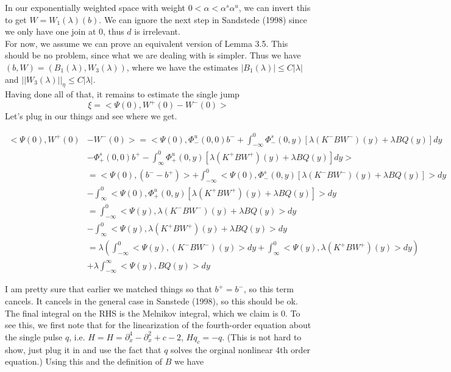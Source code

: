 \documentclass[12pt]{article}
\begin{document}
In our exponentially weighted space with weight $0 < \alpha < \alpha^s \alpha^u$, we can invert this to get $W = W_1(\lambda)(b)$. We can ignore the next step in Sandstede (1998) since we only have one join at 0, thus $d$ is irrelevant. \\

For now, we assume we can prove an equivalent version of Lemma 3.5. This should be no problem, since what we are dealing with is simpler. Thus we have $(b, W) = (B_1(\lambda), W_3(\lambda))$, where we have the estimates $|B_1(\lambda)| \leq C|\lambda|$ and $||W_3(\lambda)||_\eta \leq C|\lambda|$.\\

Having done all of that, it remains to estimate the single jump
\[
\xi = <\Psi(0), W^+(0) - W^-(0)>
\]
Let's plug in our things and see where we get.

\begin{align*}
<\Psi(0), W^+(0) &- W^-(0)> = < \Psi(0), \Phi^u_-(0, 0)b^- + \int_{-\infty}^0 \Phi^s_-(0, y)[\lambda (K^- B W^-)(y) + \lambda B Q(y) ] dy  \\
&- \Phi^s_+(0, 0)b^+ - \int_\infty^0 \Phi^u_+(0, y)[\lambda (K^+ B W^+)(y) + \lambda B Q(y) ] dy >\\
&= < \Psi(0), (b^- - b^+)> + \int_{-\infty}^0 < \Psi(0), \Phi^s_-(0, y)[\lambda (K^- B W^-)(y) + \lambda B Q(y) ] > dy  \\
&- \int_\infty^0 < \Psi(0), \Phi^u_+(0, y)[\lambda (K^+ B W^+)(y) + \lambda B Q(y) ] > dy  \\
&= \int_{-\infty}^0 < \Psi(y), \lambda (K^- B W^-)(y) + \lambda B Q(y) > dy \\
&- \int_\infty^0 < \Psi(y), \lambda (K^+ B W^+)(y) + \lambda B Q(y)  > dy \\
&= \lambda\left( \int_{-\infty}^0 < \Psi(y), (K^- B W^-)(y) > dy + \int_\infty^0 < \Psi(y), \lambda (K^+ B W^+)(y)> dy \right) \\
&+ \lambda \int_{-\infty}^\infty <\Psi(y), BQ(y)> dy
\end{align*}

I am pretty sure that earlier we matched things so that $b^+ = b^-$, so this term cancels. It cancels in the general case in Sanstede (1998), so this should be ok.\\

The final integral on the RHS is the Melnikov integral, which we claim is 0. To see this, we first note that for the linearization of the fourth-order equation about the single pulse $q$, i.e. $H = H = \partial_x^4 - \partial_x^2 + c - 2 $, $Hq_c = -q$. (This is not hard to show, just plug it in and use the fact that $q$ solves the orginal nonlinear 4th order equation.) Using this and the definition of $B$ we have
\end{document}

